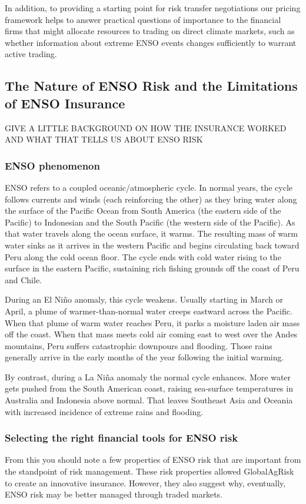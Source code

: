 \documentclass[authoryear]{article}
\begin{document}
In addition, to providing a starting point for risk transfer negotiations our pricing framework helps to answer practical questions of importance to the financial firms that might allocate resources to trading on direct climate markets, such as whether information about extreme ENSO events changes sufficiently to warrant active trading.

\subsection{The Nature of ENSO Risk and the Limitations of ENSO Insurance}
GIVE A LITTLE BACKGROUND ON HOW THE INSURANCE WORKED AND WHAT THAT TELLS US ABOUT ENSO RISK

\subsubsection{ENSO phenomenon}

ENSO refers to a coupled oceanic/atmospheric cycle. In normal years, the cycle follows currents and winds (each reinforcing the other) as they bring water along the surface of the Pacific Ocean from South America (the eastern side of the Pacific) to Indonesian and the South Pacific (the western side of the Pacific). As that water travels along the ocean surface, it warms. The resulting mass of warm water sinks as it arrives in the western Pacific and begins circulating back toward Peru along the cold ocean floor. The cycle ends with cold water rising to the surface in the eastern Pacific, sustaining rich fishing grounds off the coast of Peru and Chile.

During an El Ni\~no anomaly, this cycle weakens. Usually starting in March or April, a plume of warmer-than-normal water creeps eastward across the Pacific. When that plume of warm water reaches Peru, it parks a moisture laden air mass off the coast. When that mass meets cold air coming east to west over the Andes mountains, Peru suffers catastrophic downpours and flooding. Those rains generally arrive in the early months of the year following the initial warming.

By contrast, during a La Ni\~na anomaly the normal cycle enhances. More water gets pushed from the South American coast, raising sea-surface temperatures in Australia and Indonesia above normal. That leaves Southeast Asia and Oceania with increased incidence of extreme rains and flooding.

\subsubsection{Selecting the right financial tools for ENSO risk}
From this you should note a few properties of ENSO risk that are important from the standpoint of risk management.
These risk properties allowed GlobalAgRisk to create an innovative insurance. However, they also suggest why, eventually, ENSO risk may be better managed through traded markets.
\end{document}
